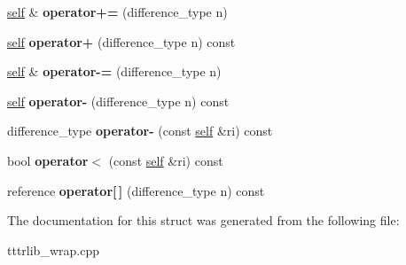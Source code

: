 \begin{DoxyCompactItemize}
\item 
\mbox{\label{structswig_1_1_swig_py_sequence___input_iterator_abff285d61554d58f95218ed8b58fb2e8}} 
\hyperlink{structswig_1_1_swig_py_sequence___input_iterator}{self} \& {\bfseries operator+=} (difference\+\_\+type n)
\item 
\mbox{\label{structswig_1_1_swig_py_sequence___input_iterator_ac9944e0170aff64c4a54eb0156e89839}} 
\hyperlink{structswig_1_1_swig_py_sequence___input_iterator}{self} {\bfseries operator+} (difference\+\_\+type n) const
\item 
\mbox{\label{structswig_1_1_swig_py_sequence___input_iterator_a2156567b8085288817b8f2ed9a13500e}} 
\hyperlink{structswig_1_1_swig_py_sequence___input_iterator}{self} \& {\bfseries operator-\/=} (difference\+\_\+type n)
\item 
\mbox{\label{structswig_1_1_swig_py_sequence___input_iterator_aef6a178c9d3379f989dd5b1f03e744bf}} 
\hyperlink{structswig_1_1_swig_py_sequence___input_iterator}{self} {\bfseries operator-\/} (difference\+\_\+type n) const
\item 
\mbox{\label{structswig_1_1_swig_py_sequence___input_iterator_a7261ec6cb32a1740e0e2836e2ce31495}} 
difference\+\_\+type {\bfseries operator-\/} (const \hyperlink{structswig_1_1_swig_py_sequence___input_iterator}{self} \&ri) const
\item 
\mbox{\label{structswig_1_1_swig_py_sequence___input_iterator_aa86abc679e1f39a48692704314f4ce21}} 
bool {\bfseries operator$<$} (const \hyperlink{structswig_1_1_swig_py_sequence___input_iterator}{self} \&ri) const
\item 
\mbox{\label{structswig_1_1_swig_py_sequence___input_iterator_aac69219ece9efef26c9a171a6952ee94}} 
reference {\bfseries operator\mbox{[}$\,$\mbox{]}} (difference\+\_\+type n) const
\end{DoxyCompactItemize}


The documentation for this struct was generated from the following file\+:\begin{DoxyCompactItemize}
\item 
tttrlib\+\_\+wrap.\+cpp\end{DoxyCompactItemize}
